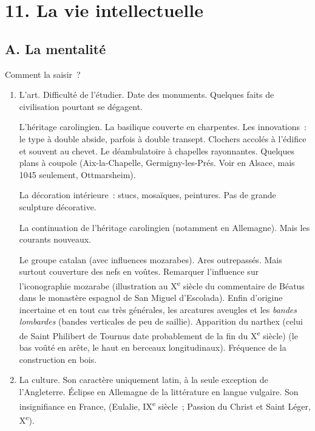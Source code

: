 \documentclass[french,twoside]{book} %
\newcommand\chapteropen{} %
\newcommand\chaptercont{} %
\begin{document}
\chapteropen
\chapter[{11. La vie intellectuelle}]{\textsc{11. }La vie intellectuelle}
\label{c11}\renewcommand{\leftmark}{\textsc{11. }La vie intellectuelle}


\chaptercont
\section[{A. La mentalité}]{A. La mentalité}
\label{c11a}
\noindent  {}
\label{p115} Comment la saisir ?\par

\begin{enumerate}[itemsep=\baselineskip,]
\item  L’art. Difficulté de l’étudier. Date des monuments. Quelques faits de civilisation pourtant se dégagent.\par
 L’héritage carolingien. La basilique couverte en charpentes. Les innovations : le type à double abside, parfois à double transept. Clochers accolés à l’édifice et souvent au chevet. Le déambulatoire à chapelles rayonnantes. Quelques plans à coupole (Aix-la-Chapelle, Germigny-les-Prés. Voir en Alsace, mais 1045 seulement, Ottmarsheim).\par
 La décoration intérieure : stucs, mosaïques, peintures. Pas de grande sculpture décorative.\par
 La continuation de l’héritage carolingien (notamment en Allemagne). Mais les courants nouveaux.\par
 Le groupe catalan (avec influences mozarabes). Ares outrepassés. Mais surtout couverture des nefs en voûtes. Remarquer l’influence sur l’iconographie mozarabe (illustration au X\textsuperscript{e} siècle du commentaire de Béatus dans le monastère espagnol de San Miguel d’Escolada). Enfin d’origine incertaine et en tout cas très générales, les arcatures aveugles et les \emph{bandes lombardes} (bandes verticales de peu de saillie). Apparition du narthex (celui de Saint Philibert de Tournus date probablement de la fin du X\textsuperscript{e} siècle) (le bas voûté en arête, le haut en berceaux longitudinaux). Fréquence de la construction en bois.
 
\item La culture. Son caractère uniquement latin, à la seule exception de l’Angleterre. Éclipse en Allemagne de la littérature en langue vulgaire. Son insignifiance en France, (Eulalie, IX\textsuperscript{e} siècle ; Passion du Christ et Saint Léger, X\textsuperscript{e}).
\end{enumerate}
\end{document}
